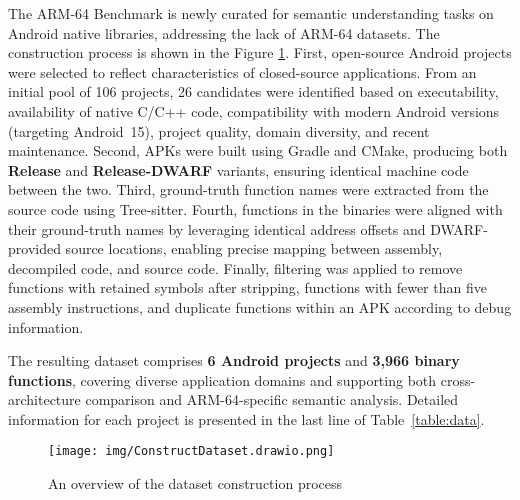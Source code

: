\documentclass[acmsmall,screen,review,anonymous]{acmart} %
\begin{document}
The ARM-64 Benchmark is newly curated for semantic understanding tasks on Android native libraries, addressing the lack of ARM-64 datasets. The construction process is shown in the Figure \ref{fig:construct-dataset}. First, open-source Android projects were selected to reflect characteristics of closed-source applications. From an initial pool of 106 projects, 26 candidates were identified based on executability, availability of native C/C++ code, compatibility with modern Android versions (targeting Android~15), project quality, domain diversity, and recent maintenance. Second, APKs were built using Gradle and CMake, producing both \textbf{Release} and \textbf{Release-DWARF} variants, ensuring identical machine code between the two. Third, ground-truth function names were extracted from the source code using Tree-sitter. Fourth, functions in the binaries were aligned with their ground-truth names by leveraging identical address offsets and DWARF-provided source locations, enabling precise mapping between assembly, decompiled code, and source code. Finally, filtering was applied to remove functions with retained symbols after stripping, functions with fewer than five assembly instructions, and duplicate functions within an APK according to debug information.

The resulting dataset comprises \textbf{6 Android projects} and \textbf{3,966 binary functions}, covering diverse application domains and supporting both cross-architecture comparison and ARM-64-specific semantic analysis. Detailed information for each project is presented in the last line of Table~\ref{table:data}.

\begin{figure}[t] %
    \centering
    \texttt{[image: img/ConstructDataset.drawio.png]} %
    \caption{An overview of the dataset construction process} %
    \label{fig:construct-dataset} %
\end{figure}
\end{document}
